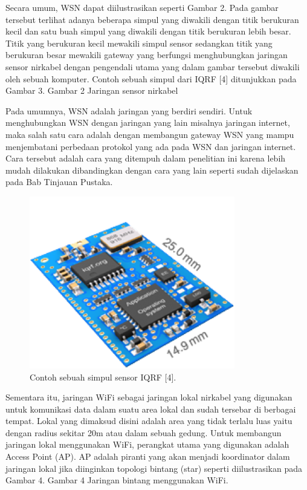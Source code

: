 \documentclass{jtetiproposalskripsi}
\begin{document}
Secara umum, WSN dapat diilustrasikan seperti Gambar 2. Pada gambar tersebut terlihat adanya beberapa simpul yang diwakili dengan titik berukuran kecil dan satu buah simpul yang diwakili dengan titik berukuran lebih besar. Titik yang berukuran kecil mewakili simpul sensor sedangkan titik yang berukuran besar mewakili gateway yang berfungsi menghubungkan jaringan sensor nirkabel dengan pengendali utama yang dalam gambar tersebut diwakili oleh sebuah komputer. Contoh sebuah simpul dari IQRF [4] ditunjukkan pada Gambar 3.
Gambar 2 Jaringan sensor nirkabel

Pada umumnya, WSN adalah jaringan yang berdiri sendiri. Untuk menghubungkan WSN dengan jaringan yang lain misalnya jaringan internet, maka salah satu cara adalah dengan membangun gateway WSN yang mampu menjembatani perbedaan protokol yang ada pada WSN dan jaringan internet. Cara tersebut adalah cara yang ditempuh dalam penelitian ini karena lebih mudah dilakukan dibandingkan dengan cara yang lain seperti sudah dijelaskan pada Bab Tinjauan Pustaka.

\begin{figure}[ht!]
  \centering
    \includegraphics{gambar/iqrf}
    \caption{Contoh sebuah simpul sensor IQRF [4].}
\end{figure}

Sementara itu, jaringan WiFi sebagai jaringan lokal nirkabel yang digunakan untuk komunikasi data dalam suatu area lokal dan sudah tersebar di berbagai tempat. Lokal yang dimaksud disini adalah area yang tidak terlalu luas yaitu dengan radius sekitar 20m atau dalam sebuah gedung. Untuk membangun jaringan lokal menggunakan WiFi, perangkat utama yang digunakan adalah Access Point (AP). AP adalah piranti yang akan menjadi koordinator dalam jaringan lokal jika diinginkan topologi bintang (star) seperti diilustrasikan pada Gambar 4.
Gambar 4 Jaringan bintang menggunakan WiFi.
\end{document}

